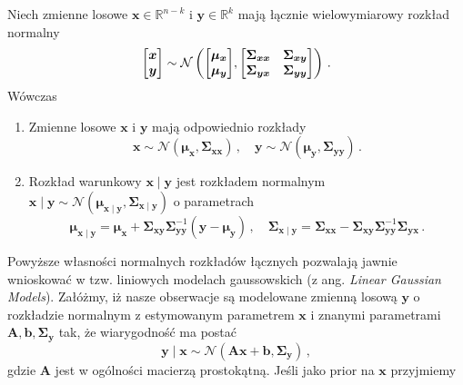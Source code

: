 \documentclass{myclass}
\numberwithin{equation}{subsection}
\begin{document}
\begin{theorem}\label{th:gauss_model} Niech zmienne losowe \(\bm{x} \in \mathbb{R}^{n-k}\) i
\(\bm{y} \in \mathbb{R}^k\) mają łącznie wielowymiarowy rozkład normalny
\begin{equation*}
    \mqty[\bm{x} \\ \bm{y}] \sim \mathcal{N}\left(\mqty[\bm{\mu}_{\bm{x}} \\ \bm{\mu}_{\bm{y}}], \mqty[\bm{\Sigma}_{\bm{xx}} & \bm{\Sigma}_{\bm{xy}} \\ \bm{\Sigma}_{\bm{yx}} & \bm{\Sigma}_{\bm{yy}}] \right)\,.
\end{equation*} 
Wówczas
\begin{enumerate}
    
    \item Zmienne losowe \(\bm{x}\) i \(\bm{y}\) mają odpowiednio rozkłady
    \begin{equation*}
        \bm{x} \sim \mathcal{N}(\bm{\mu}_{\bm{x}}, \bm{\Sigma}_{\bm{xx}})\,,\quad \bm{y} \sim \mathcal{N}(\bm{\mu}_{\bm{y}}, \bm{\Sigma}_{\bm{yy}})\,.
    \end{equation*}

    \item Rozkład warunkowy \(\bm{x} \mid \bm{y}\) jest rozkładem normalnym \(\bm{x} \mid \bm{y}
    \sim \mathcal{N}(\bm{\mu}_{\bm{x}\mid\bm{y}}, \bm{\Sigma}_{\bm{x}\mid\bm{y}})\) o parametrach
    \begin{equation*}
        \bm{\mu}_{\bm{x}\mid\bm{y}} = \bm{\mu}_{\bm{x}} + \bm{\Sigma}_{\bm{xy}}\bm{\Sigma}_{\bm{yy}}^{-1}(\bm{y} - \bm{\mu}_{\bm{y}})\,,\quad \bm{\Sigma}_{\bm{x}\mid\bm{y}} = \bm{\Sigma}_{\bm{xx}} - \bm{\Sigma}_{\bm{xy}}\bm{\Sigma}_{\bm{yy}}^{-1}\bm{\Sigma}_{\bm{yx}}\,.
    \end{equation*}
\end{enumerate}
\end{theorem}
Powyższe własności normalnych rozkładów łącznych pozwalają jawnie wnioskować w tzw. liniowych
modelach gaussowskich (z ang. \textit{Linear Gaussian Models}). Załóżmy, iż nasze obserwacje są
modelowane zmienną losową \(\bm{y}\) o rozkładzie normalnym z estymowanym parametrem \(\bm{x}\) i
znanymi parametrami \(\bm{A}, \bm{b}, \bm{\Sigma}_{\bm{y}}\) tak, że wiarygodność ma postać
\begin{equation}
    \bm{y} \mid \bm{x} \sim \mathcal{N}(\bm{A}\bm{x} + \bm{b}, \bm{\Sigma}_{\bm{y}})\,,
\end{equation}
gdzie \(\bm{A}\) jest w ogólności macierzą prostokątną. Jeśli jako prior na \(\bm{x}\) przyjmiemy
\end{document}
